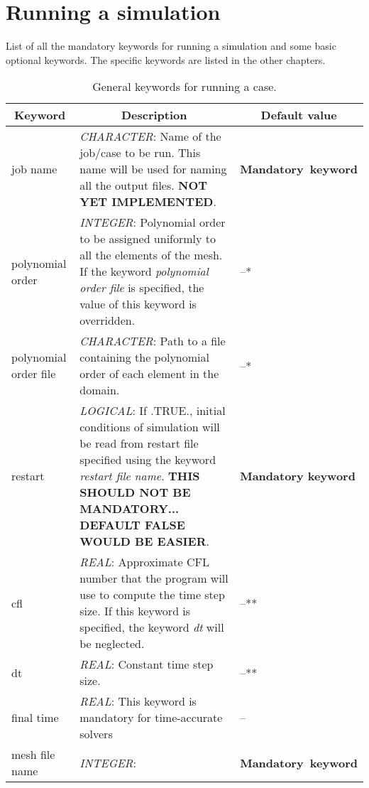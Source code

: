 \documentclass[a4paper,10pt]{report}
\begin{document}
\chapter{Running a simulation}
List of all the mandatory keywords for running a simulation and some basic optional keywords. The specific keywords are listed in the other chapters.
\begin{table}[htbp]
\caption{General keywords for running a case.}
\begin{tabular}{|l|p{10cm}|p{2.2cm}|}
\hline
\multicolumn{1}{|c|}{Keyword} & \multicolumn{1}{c|}{Description} & \multicolumn{1}{c|}{Default value} \\ \hline

job name   & \textit{CHARACTER}: Name of the job/case to be run. This name will be used for naming all the output files. \textbf{NOT YET IMPLEMENTED}. & \textbf{Mandatory\ keyword} \\ \hline

polynomial order   & \textit{INTEGER}: Polynomial order to be assigned uniformly to all the elements of the mesh. If the keyword \textit{polynomial order file} is specified, the value of this keyword is overridden. & --* \\ \hline

polynomial order file  & \textit{CHARACTER}: Path to a file containing the polynomial order of each element in the domain. & --* \\ \hline

restart 			& \textit{LOGICAL}: If .TRUE., initial conditions of simulation will be read from restart file specified using the keyword \textit{restart file name}. \textbf{THIS SHOULD NOT BE MANDATORY... DEFAULT FALSE WOULD BE EASIER}. & \textbf{Mandatory keyword} \\ \hline

cfl & \textit{REAL}: Approximate CFL number that the program will use to compute the time step size. If this keyword is specified, the keyword \textit{dt} will be neglected. & --** \\ \hline

dt  & \textit{REAL}: Constant time step size.  & --** \\ \hline

final time  & \textit{REAL}: This keyword is mandatory for time-accurate solvers & -- \\ \hline

mesh file name & \textit{INTEGER}:  & \textbf{Mandatory\ keyword} \\ \hline


\end{tabular}
\end{table}
\end{document}

